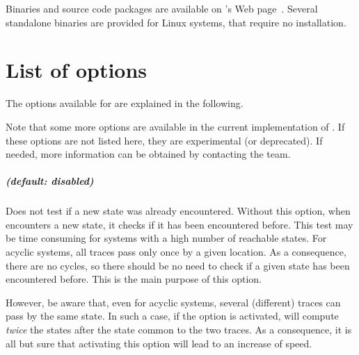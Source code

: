 Binaries and source code packages are available on \imitator{}'s Web page~\cite{imitator}.
Several standalone binaries are provided for Linux systems, that require no installation.








\chapter{List of options}\label{chapter:options}

The options available for \imitator{} are explained in the following.

Note that some more options are available in the current implementation of \imitator{}.
If these options are not listed here, they are experimental (or deprecated).
If needed, more information can be obtained by contacting the \imitator{} team.



\paragraph{ (default: disabled)}
Does not test if a new state was already encountered.
Without this option, when \imitator{} encounters a new state, it checks if it has been encountered before.
This test may be time consuming for systems with a high number of reachable states.
For acyclic systems, all traces pass only once by a given location.
As a consequence, there are no cycles, so there should be no need to check if a given state has been encountered before.
This is the main purpose of this option.

However, be aware that, even for acyclic systems, several (different) traces can pass by the same state.
In such a case, if the  option is activated, \imitator{} will compute \emph{twice} the states after the state common to the two traces.
As a consequence, it is all but sure that activating this option will lead to an increase of speed.

